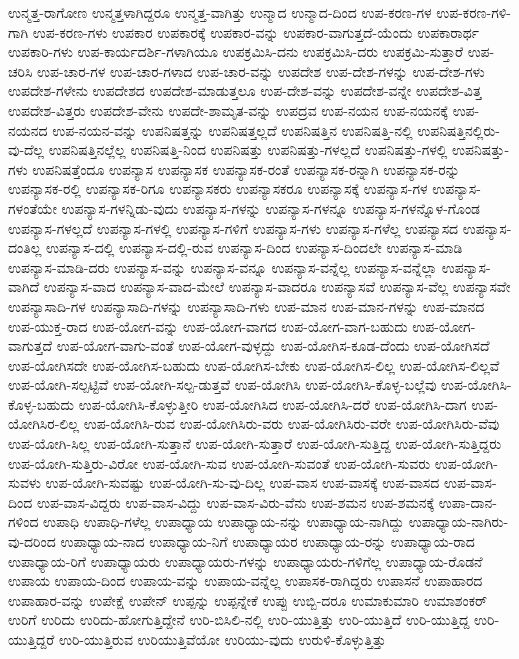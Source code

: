 {ಉನ್ಮತ್ತ-ರಾಗೋಣ
ಉನ್ಮತ್ತಳಾಗಿದ್ದರೂ
ಉನ್ಮತ್ತ-ವಾಗಿತ್ತು
ಉನ್ಮಾದ
ಉನ್ಮಾದ-ದಿಂದ
ಉಪ-ಕರಣ-ಗಳ
ಉಪ-ಕರಣ-ಗಳಿ-ಗಾಗಿ
ಉಪ-ಕರಣ-ಗಳು
ಉಪಕಾರ
ಉಪಕಾರಕ್ಕೆ
ಉಪಕಾರ-ವನ್ನು
ಉಪಕಾರ-ವಾಗುತ್ತದೆ-ಯೆಂದು
ಉಪಕಾರಾರ್ಥ
ಉಪಕಾರಿ-ಗಳು
ಉಪ-ಕಾರ್ಯದರ್ಶಿ-ಗಳಾಗಿಯೂ
ಉಪಕ್ರಮಿಸಿ-ದನು
ಉಪಕ್ರಮಿಸಿ-ದರು
ಉಪಕ್ರಮಿ-ಸುತ್ತಾರೆ
ಉಪ-ಚರಿಸಿ
ಉಪ-ಚಾರ-ಗಳ
ಉಪ-ಚಾರ-ಗಳಾದ
ಉಪ-ಚಾರ-ವನ್ನು
ಉಪದೇಶ
ಉಪ-ದೇಶ-ಗಳನ್ನು
ಉಪ-ದೇಶ-ಗಳು
ಉಪದೇಶ-ಗಳೇನು
ಉಪದೇಶದ
ಉಪದೇಶ-ಮಾಡುತ್ತಲೂ
ಉಪ-ದೇಶ-ವನ್ನು
ಉಪದೇಶ-ವನ್ನೇ
ಉಪದೇಶ-ವಿತ್ತ
ಉಪದೇಶ-ವಿತ್ತರು
ಉಪದೇಶ-ವೇನು
ಉಪದೇ-ಶಾಮೃತ-ವನ್ನು
ಉಪದ್ರವ
ಉಪ-ನಯನ
ಉಪ-ನಯನಕ್ಕೆ
ಉಪ-ನಯನದ
ಉಪ-ನಯನ-ವನ್ನು
ಉಪನಿಷತ್ತನ್ನು
ಉಪನಿಷತ್ತಲ್ಲದೆ
ಉಪನಿಷತ್ತಿನ
ಉಪನಿಷತ್ತಿ-ನಲ್ಲಿ
ಉಪನಿಷತ್ತಿನಲ್ಲಿರು-ವು-ದೆಲ್ಲ
ಉಪನಿಷತ್ತಿನಲ್ಲೆಲ್ಲ
ಉಪನಿಷತ್ತಿ-ನಿಂದ
ಉಪನಿಷತ್ತು
ಉಪನಿಷತ್ತು-ಗಳಲ್ಲದೆ
ಉಪನಿಷತ್ತು-ಗಳಲ್ಲಿ
ಉಪನಿಷತ್ತು-ಗಳು
ಉಪನಿಷತ್ತೆಂದೂ
ಉಪನ್ಯಾಸ
ಉಪನ್ಯಾಸಕ
ಉಪನ್ಯಾಸಕ-ರಂತೆ
ಉಪನ್ಯಾಸಕ-ರನ್ನಾಗಿ
ಉಪನ್ಯಾಸಕ-ರನ್ನು
ಉಪನ್ಯಾಸಕ-ರಲ್ಲಿ
ಉಪನ್ಯಾಸಕ-ರಿಗೂ
ಉಪನ್ಯಾಸಕರು
ಉಪನ್ಯಾಸಕರೂ
ಉಪನ್ಯಾಸಕ್ಕೆ
ಉಪನ್ಯಾಸ-ಗಳ
ಉಪನ್ಯಾಸ-ಗಳಂತೆಯೇ
ಉಪನ್ಯಾಸ-ಗಳನ್ನಿಡು-ವುದು
ಉಪನ್ಯಾಸ-ಗಳನ್ನು
ಉಪನ್ಯಾಸ-ಗಳನ್ನೂ
ಉಪನ್ಯಾಸ-ಗಳನ್ನೊಳ-ಗೊಂಡ
ಉಪನ್ಯಾಸ-ಗಳಲ್ಲದೆ
ಉಪನ್ಯಾಸ-ಗಳಲ್ಲಿ
ಉಪನ್ಯಾಸ-ಗಳಿಗೆ
ಉಪನ್ಯಾಸ-ಗಳು
ಉಪನ್ಯಾಸ-ಗಳೆಲ್ಲ
ಉಪನ್ಯಾಸದ
ಉಪನ್ಯಾಸ-ದಂತಿಲ್ಲ
ಉಪನ್ಯಾಸ-ದಲ್ಲಿ
ಉಪನ್ಯಾಸ-ದಲ್ಲಿ-ರುವ
ಉಪನ್ಯಾಸ-ದಿಂದ
ಉಪನ್ಯಾಸ-ದಿಂದಲೇ
ಉಪನ್ಯಾಸ-ಮಾಡಿ
ಉಪನ್ಯಾಸ-ಮಾಡಿ-ದರು
ಉಪನ್ಯಾಸ-ವನ್ನು
ಉಪನ್ಯಾಸ-ವನ್ನೂ
ಉಪನ್ಯಾಸ-ವನ್ನೆಲ್ಲ
ಉಪನ್ಯಾಸ-ವನ್ನೆಲ್ಲಾ
ಉಪನ್ಯಾಸ-ವಾಗಿದೆ
ಉಪನ್ಯಾಸ-ವಾದ
ಉಪನ್ಯಾಸ-ವಾದ-ಮೇಲೆ
ಉಪನ್ಯಾಸ-ವಾದರೂ
ಉಪನ್ಯಾಸವೆ
ಉಪನ್ಯಾಸ-ವೆಲ್ಲ
ಉಪನ್ಯಾಸವೇ
ಉಪನ್ಯಾಸಾದಿ-ಗಳ
ಉಪನ್ಯಾಸಾದಿ-ಗಳನ್ನು
ಉಪನ್ಯಾಸಾದಿ-ಗಳು
ಉಪ-ಮಾನ
ಉಪ-ಮಾನ-ಗಳನ್ನು
ಉಪ-ಮಾನದ
ಉಪ-ಯುಕ್ತ-ರಾದ
ಉಪ-ಯೋಗ-ವನ್ನು
ಉಪ-ಯೋಗ-ವಾಗದ
ಉಪ-ಯೋಗ-ವಾಗ-ಬಹುದು
ಉಪ-ಯೋಗ-ವಾಗುತ್ತದೆ
ಉಪ-ಯೋಗ-ವಾಗು-ವಂತೆ
ಉಪ-ಯೋಗ-ವುಳ್ಳದ್ದು
ಉಪ-ಯೋಗಿಸ-ಕೂಡ-ದೆಂದು
ಉಪ-ಯೋಗಿಸದೆ
ಉಪ-ಯೋಗಿಸದೇ
ಉಪ-ಯೋಗಿಸ-ಬಹುದು
ಉಪ-ಯೋಗಿಸ-ಬೇಕು
ಉಪ-ಯೋಗಿಸ-ಲಿಲ್ಲ
ಉಪ-ಯೋಗಿಸ-ಲಿಲ್ಲವೆ
ಉಪ-ಯೋಗಿ-ಸಲ್ಪಟ್ಟಿವೆ
ಉಪ-ಯೋಗಿ-ಸಲ್ಪ-ಡುತ್ತವೆ
ಉಪ-ಯೋಗಿಸಿ
ಉಪ-ಯೋಗಿಸಿ-ಕೊಳ್ಳ-ಬಲ್ಲೆವು
ಉಪ-ಯೋಗಿಸಿ-ಕೊಳ್ಳ-ಬಹುದು
ಉಪ-ಯೋಗಿಸಿ-ಕೊಳ್ಳುತ್ತೀರಿ
ಉಪ-ಯೋಗಿಸಿದ
ಉಪ-ಯೋಗಿಸಿ-ದರೆ
ಉಪ-ಯೋಗಿಸಿ-ದಾಗ
ಉಪ-ಯೋಗಿಸಿರ-ಲಿಲ್ಲ
ಉಪ-ಯೋಗಿಸಿ-ರುವ
ಉಪ-ಯೋಗಿಸಿರು-ವರು
ಉಪ-ಯೋಗಿಸಿರು-ವರೇ
ಉಪ-ಯೋಗಿಸಿರು-ವೆವು
ಉಪ-ಯೋಗಿ-ಸಿಲ್ಲ
ಉಪ-ಯೋಗಿ-ಸುತ್ತಾನೆ
ಉಪ-ಯೋಗಿ-ಸುತ್ತಾರೆ
ಉಪ-ಯೋಗಿ-ಸುತ್ತಿದ್ದ
ಉಪ-ಯೋಗಿ-ಸುತ್ತಿದ್ದರು
ಉಪ-ಯೋಗಿ-ಸುತ್ತಿರು-ವಿರೋ
ಉಪ-ಯೋಗಿ-ಸುವ
ಉಪ-ಯೋಗಿ-ಸುವಂತೆ
ಉಪ-ಯೋಗಿ-ಸುವರು
ಉಪ-ಯೋಗಿ-ಸುವಳು
ಉಪ-ಯೋಗಿ-ಸುವಷ್ಟು
ಉಪ-ಯೋಗಿ-ಸು-ವು-ದಿಲ್ಲ
ಉಪ-ವಾಸ
ಉಪ-ವಾಸಕ್ಕೆ
ಉಪ-ವಾಸದ
ಉಪ-ವಾಸ-ದಿಂದ
ಉಪ-ವಾಸ-ವಿದ್ದರು
ಉಪ-ವಾಸ-ವಿದ್ದು
ಉಪ-ವಾಸ-ವಿರು-ವೆನು
ಉಪ-ಶಮನ
ಉಪ-ಶಮನಕ್ಕೆ
ಉಪಾ-ದಾನ-ಗಳಿಂದ
ಉಪಾಧಿ
ಉಪಾಧಿ-ಗಳೆಲ್ಲ
ಉಪಾಧ್ಯಾಯ
ಉಪಾಧ್ಯಾಯ-ನನ್ನು
ಉಪಾಧ್ಯಾಯ-ನಾಗಿದ್ದು
ಉಪಾಧ್ಯಾಯ-ನಾಗಿರು-ವು-ದರಿಂದ
ಉಪಾಧ್ಯಾಯ-ನಾದ
ಉಪಾಧ್ಯಾಯ-ನಿಗೆ
ಉಪಾಧ್ಯಾಯರ
ಉಪಾಧ್ಯಾಯ-ರನ್ನು
ಉಪಾಧ್ಯಾಯ-ರಾದ
ಉಪಾಧ್ಯಾಯ-ರಿಗೆ
ಉಪಾಧ್ಯಾಯರು
ಉಪಾಧ್ಯಾಯರು-ಗಳನ್ನು
ಉಪಾಧ್ಯಾಯರು-ಗಳಿಗೆಲ್ಲ
ಉಪಾಧ್ಯಾಯ-ರೊಡನೆ
ಉಪಾಯ
ಉಪಾಯ-ದಿಂದ
ಉಪಾಯ-ವನ್ನು
ಉಪಾಯ-ವನ್ನೆಲ್ಲ
ಉಪಾಸಕ-ರಾಗಿದ್ದರು
ಉಪಾಸನೆ
ಉಪಾಹಾರದ
ಉಪಾಹಾರ-ವನ್ನು
ಉಪೇಕ್ಷೆ
ಉಪೇನ್
ಉಪ್ಪನ್ನು
ಉಪ್ಪನ್ನೇಕೆ
ಉಪ್ಪು
ಉಬ್ಬಿ-ದರೂ
ಉಮಾಕುಮಾರಿ
ಉಮಾಶಂಕರ್
ಉರಿಗೆ
ಉರಿದು
ಉರಿದು-ಹೋಗುತ್ತಿದ್ದೇನೆ
ಉರಿ-ಬಿಸಿಲಿ-ನಲ್ಲಿ
ಉರಿ-ಯುತ್ತಿತ್ತು
ಉರಿ-ಯುತ್ತಿದೆ
ಉರಿ-ಯುತ್ತಿದ್ದ
ಉರಿ-ಯುತ್ತಿದ್ದರೆ
ಉರಿ-ಯುತ್ತಿರುವ
ಉರಿಯುತ್ತಿವೆಯೋ
ಉರಿಯು-ವುದು
ಉರುಳಿ-ಕೊಳ್ಳುತ್ತಿತ್ತು
}
